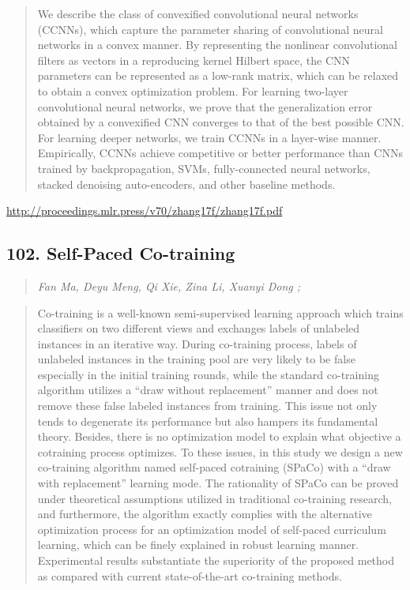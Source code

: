 \documentclass{article}
\begin{document}
\begin{quote}
    We describe the class of convexified convolutional neural networks (CCNNs), which capture the parameter sharing of convolutional neural networks in a convex manner. By representing the nonlinear convolutional filters as vectors in a reproducing kernel Hilbert space, the CNN parameters can be represented as a low-rank matrix, which can be relaxed to obtain a convex optimization problem. For learning two-layer convolutional neural networks, we prove that the generalization error obtained by a convexified CNN converges to that of the best possible CNN. For learning deeper networks, we train CCNNs in a layer-wise manner. Empirically, CCNNs achieve competitive or better performance than CNNs trained by backpropagation, SVMs, fully-connected neural networks, stacked denoising auto-encoders, and other baseline methods.  \end{quote}

\href{http://proceedings.mlr.press/v70/zhang17f/zhang17f.pdf}{http://proceedings.mlr.press/v70/zhang17f/zhang17f.pdf}

\subsection{102. Self-Paced Co-training}

\begin{quote}
\footnotesize{\textit{Fan Ma, Deyu Meng, Qi Xie, Zina Li, Xuanyi Dong ;}}
\end{quote}

\begin{quote}
    Co-training is a well-known semi-supervised learning approach which trains classifiers on two different views and exchanges labels of unlabeled instances in an iterative way. During co-training process, labels of unlabeled instances in the training pool are very likely to be false especially in the initial training rounds, while the standard co-training algorithm utilizes a “draw without replacement” manner and does not remove these false labeled instances from training. This issue not only tends to degenerate its performance but also hampers its fundamental theory. Besides, there is no optimization model to explain what objective a cotraining process optimizes. To these issues, in this study we design a new co-training algorithm named self-paced cotraining (SPaCo) with a “draw with replacement” learning mode. The rationality of SPaCo can be proved under theoretical assumptions utilized in traditional co-training research, and furthermore, the algorithm exactly complies with the alternative optimization process for an optimization model of self-paced curriculum learning, which can be finely explained in robust learning manner. Experimental results substantiate the superiority of the proposed method as compared with current state-of-the-art co-training methods.  \end{quote}
\end{document}

